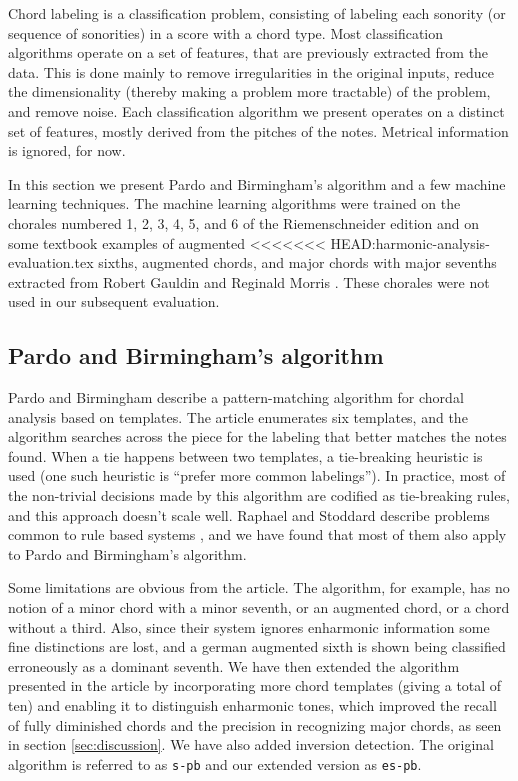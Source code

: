 \documentclass{article}
\begin{document}
Chord labeling is a classification problem, consisting of labeling
each sonority (or sequence of sonorities) in a score with a chord
type. Most classification algorithms operate on a set of features,
that are previously extracted from the data. This is done mainly to
remove irregularities in the original inputs, reduce the
dimensionality (thereby making a problem more tractable) of the
problem, and remove noise. Each classification algorithm we present
operates on a distinct set of features, mostly derived from the
pitches of the notes. Metrical information is ignored, for now.

In this section we present Pardo and Birmingham's algorithm and a few
machine learning techniques. The machine learning algorithms were
trained on the chorales numbered 1, 2, 3, 4, 5, and 6 of the
Riemenschneider edition and on some textbook examples of augmented
<<<<<<< HEAD:harmonic-analysis-evaluation.tex
sixths, augmented chords, and major chords with major sevenths extracted
from Robert Gauldin \cite{gauldin05:harmonic} and Reginald Morris
\cite{morris33:figured}. These chorales were not used in our subsequent
evaluation.

\subsection{Pardo and Birmingham's algorithm}
\label{sec:pardo}


Pardo and Birmingham \cite{barthelemy.ea01:figured} describe a
pattern-matching algorithm for chordal analysis based on templates.
The article enumerates six templates, and the algorithm searches
across the piece for the labeling that better matches the notes found.
When a tie happens between two templates, a tie-breaking heuristic is
used (one such heuristic is ``prefer more common labelings''). In
practice, most of the non-trivial decisions made by this algorithm are
codified as tie-breaking rules, and this approach doesn't scale
well. Raphael and Stoddard describe problems common to rule based
systems \cite{raphael.ea03:harmonic}, and we have found that most of
them also apply to Pardo and Birmingham's algorithm.

Some limitations are obvious from the article. The algorithm, for
example, has no notion of a minor chord with a minor seventh, or an
augmented chord, or a chord without a third. Also, since their system
ignores enharmonic information some fine distinctions are lost, and a
german augmented sixth is shown being classified erroneously as a
dominant seventh. We have then extended the algorithm presented in the
article by incorporating more chord templates (giving a total of ten)
and enabling it to distinguish enharmonic tones, which improved the
recall of fully diminished chords and the precision in recognizing
major chords, as seen in section \ref{sec:discussion}. We have also
added inversion detection. The original algorithm is referred to as
\texttt{s-pb} and our extended version as \texttt{es-pb}.
\end{document}
